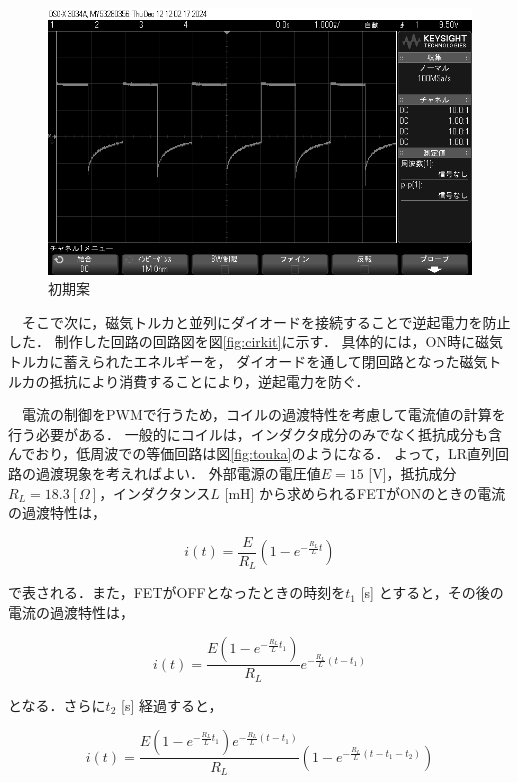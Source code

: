 \begin{figure}[H]
	\centering
		\includegraphics[scale=0.3]{./figure/scope_5.png}
		\caption{初期案}
		\label{fig:osiro1}
\end{figure}


　そこで次に，磁気トルカと並列にダイオードを接続することで逆起電力を防止した．
制作した回路の回路図を図\ref{fig:cirkit}に示す．
具体的には，ON時に磁気トルカに蓄えられたエネルギーを，
ダイオードを通して閉回路となった磁気トルカの抵抗により消費することにより，逆起電力を防ぐ．

　電流の制御をPWMで行うため，コイルの過渡特性を考慮して電流値の計算を行う必要がある．
一般的にコイルは，インダクタ成分のみでなく抵抗成分も含んでおり，低周波での等価回路は図\ref{fig:touka}のようになる．
よって，LR直列回路の過渡現象を考えればよい．
外部電源の電圧値$E=15$ [V]，抵抗成分$R_L=18.3[\Omega]$，インダクタンス$L$ [mH] から求められるFETがONのときの電流の過渡特性は，

\begin{equation}
	i(t) = \frac{E}{R_L}\left(1-e^{-\frac{R_L}{L}t}\right)
\end{equation}

で表される．また，FETがOFFとなったときの時刻を$t_1$ [s] とすると，その後の電流の過渡特性は，

\begin{equation}
	i(t) = \frac{E\left(1-e^{-\frac{R_L}{L}t_1}\right)}{R_L}e^{-\frac{R_L}{L}(t-t_1)}
\end{equation}

となる．さらに$t_2$ [s] 経過すると，

\begin{equation}
	i(t) = \frac{E\left(1-e^{-\frac{R_L}{L}t_1}\right)e^{-\frac{R_L}{L}(t-t_1)}}{R_L}\left(1-e^{-\frac{R_L}{L}(t-t_1-t_2)}\right)
\end{equation}

